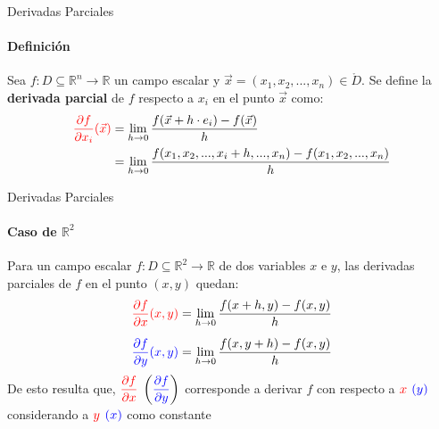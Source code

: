 \documentclass{plantillaPPT}
\begin{document}
\primeraDiapo

\begin{frame}{Derivadas Parciales}
\framesubtitle{Definición}

\begin{definicion}
    Sea \(f:D \subseteq \mathbb{R}^n\to \mathbb{R}\) un campo escalar y \(\vec{x} = (x_1, x_2, ..., x_n)\in \mathring{D}\). Se define la \textbf{derivada parcial} de \(f\) respecto a \(x_i\) en el punto \(\vec{x}\) como:
    \begin{align*}
    \textcolor{red}{\frac{\partial f}{\partial x_i} (\vec{x})} &= \lim_{h \to 0} \frac{f(\vec{x}+h\cdot e_i)-f(\vec{x})}{h} \\
    &= \lim_{h \to 0} \frac{f(x_1, x_2, ..., x_i+h, ..., x_n)-f(x_1, x_2, ..., x_n)}{h} \\
    \end{align*}
\end{definicion}
    
\end{frame}

\begin{frame}{Derivadas Parciales}
\framesubtitle{Caso de \(\mathbb{R}^2\)}


Para un campo escalar \(f:D \subseteq \mathbb{R}^2\to \mathbb{R}\) de dos variables \(x\) e \(y\), las derivadas parciales de \(f\) en el punto \((x,y)\) quedan:
\begin{align*}
\textcolor{red}{\frac{\partial f}{\partial x} (x,y)} &= \lim_{h \to 0} \frac{f(x+h, y)-f(x,y)}{h} \\[5pt]
\textcolor{blue}{\frac{\partial f}{\partial y} (x,y)} &= \lim_{h \to 0} \frac{f(x, y+h)-f(x,y)}{h}
\end{align*}
De esto resulta que, \(\displaystyle \textcolor{red}{\frac{\partial f}{\partial x}} \; \left(\textcolor{blue}{\frac{\partial f}{\partial y}}\right) \) corresponde a derivar \(f\) con respecto a \(\textcolor{red}{x}\) \(\textcolor{blue}{(y)}\) considerando a \(\textcolor{red}{y}\) \(\textcolor{blue}{(x)}\) como constante
    
\end{frame}
\end{document}
